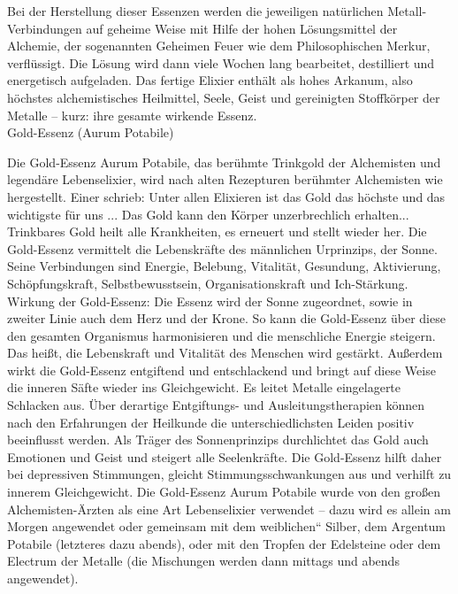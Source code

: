 \documentclass[a5paper,8pt]{book}
\begin{document}
Bei der Herstellung dieser Essenzen werden die jeweiligen natürlichen Metall-Verbindungen auf geheime Weise mit Hilfe der hohen Lösungsmittel der Alchemie, der 
sogenannten Geheimen Feuer wie dem Philosophischen Merkur, verflüssigt. Die Lösung wird dann viele Wochen lang bearbeitet, destilliert und energetisch aufgeladen. 
Das fertige Elixier enthält als hohes Arkanum, also höchstes alchemistisches Heilmittel, Seele, Geist und gereinigten Stoffkörper der Metalle – kurz: ihre gesamte 
wirkende Essenz. \\
 
\noindent Gold-Essenz (Aurum Potabile)\

Die Gold-Essenz Aurum Potabile, das berühmte Trinkgold der Alchemisten und legendäre Lebenselixier, wird nach alten Rezepturen berühmter Alchemisten wie hergestellt. 
Einer schrieb: Unter allen Elixieren ist das Gold das höchste und das wichtigste für uns ... Das Gold kann den Körper unzerbrechlich erhalten... Trinkbares Gold heilt 
alle Krankheiten, es erneuert und stellt wieder her. Die Gold-Essenz vermittelt die Lebenskräfte des männlichen Urprinzips, der Sonne. Seine Verbindungen sind Energie, 
Belebung, Vitalität, Gesundung, Aktivierung, Schöpfungskraft, Selbstbewusstsein, Organisationskraft und Ich-Stärkung. 
Wirkung der Gold-Essenz: Die Essenz wird der Sonne zugeordnet, sowie in zweiter Linie auch dem Herz und der Krone. So kann die Gold-Essenz über diese den gesamten 
Organismus harmonisieren und die menschliche Energie steigern. Das heißt, die Lebenskraft und Vitalität des Menschen wird  gestärkt. Außerdem wirkt die Gold-Essenz 
entgiftend und entschlackend und bringt auf diese Weise die inneren Säfte wieder ins Gleichgewicht. Es leitet Metalle eingelagerte Schlacken aus. Über derartige 
Entgiftungs- und Ausleitungstherapien können nach den Erfahrungen der Heilkunde die unterschiedlichsten Leiden positiv beeinflusst werden.
Als Träger des Sonnenprinzips durchlichtet das Gold auch Emotionen und Geist und steigert alle Seelenkräfte. Die Gold-Essenz hilft daher bei depressiven Stimmungen, 
gleicht Stimmungsschwankungen aus und verhilft zu innerem Gleichgewicht.
Die Gold-Essenz Aurum Potabile wurde von den großen Alchemisten-Ärzten als eine Art Lebenselixier verwendet – dazu wird es allein am Morgen angewendet oder gemeinsam 
mit dem weiblichen“ Silber, dem Argentum Potabile (letzteres dazu abends), oder mit den Tropfen der Edelsteine oder dem Electrum der Metalle (die Mischungen werden 
dann mittags und abends angewendet).\\
 
\end{document}
